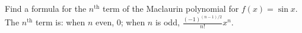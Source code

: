 {Find a formula for the $n^\text{th}$ term of the Maclaurin polynomial for $f(x)=\sin x$.
}
{The $n^\text{th}$ term is: when $n$ even, 0; when $n$ is odd, $\frac{(-1)^{(n-1)/2}}{n!}x^n$.
}